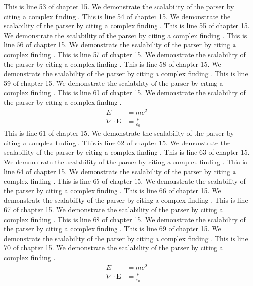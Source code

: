 This is line 53 of chapter 15. We demonstrate the scalability of the parser by citing a complex finding \cite{ref15_53}.
This is line 54 of chapter 15. We demonstrate the scalability of the parser by citing a complex finding \cite{ref15_54}.
This is line 55 of chapter 15. We demonstrate the scalability of the parser by citing a complex finding \cite{ref15_55}.
This is line 56 of chapter 15. We demonstrate the scalability of the parser by citing a complex finding \cite{ref15_56}.
This is line 57 of chapter 15. We demonstrate the scalability of the parser by citing a complex finding \cite{ref15_57}.
This is line 58 of chapter 15. We demonstrate the scalability of the parser by citing a complex finding \cite{ref15_58}.
This is line 59 of chapter 15. We demonstrate the scalability of the parser by citing a complex finding \cite{ref15_59}.
This is line 60 of chapter 15. We demonstrate the scalability of the parser by citing a complex finding \cite{ref15_60}.
\begin{align*}
  E &= mc^2 \\
  \nabla \cdot \mathbf{E} &= \frac{\rho}{\varepsilon_0}
\end{align*}
This is line 61 of chapter 15. We demonstrate the scalability of the parser by citing a complex finding \cite{ref15_61}.
This is line 62 of chapter 15. We demonstrate the scalability of the parser by citing a complex finding \cite{ref15_62}.
This is line 63 of chapter 15. We demonstrate the scalability of the parser by citing a complex finding \cite{ref15_63}.
This is line 64 of chapter 15. We demonstrate the scalability of the parser by citing a complex finding \cite{ref15_64}.
This is line 65 of chapter 15. We demonstrate the scalability of the parser by citing a complex finding \cite{ref15_65}.
This is line 66 of chapter 15. We demonstrate the scalability of the parser by citing a complex finding \cite{ref15_66}.
This is line 67 of chapter 15. We demonstrate the scalability of the parser by citing a complex finding \cite{ref15_67}.
This is line 68 of chapter 15. We demonstrate the scalability of the parser by citing a complex finding \cite{ref15_68}.
This is line 69 of chapter 15. We demonstrate the scalability of the parser by citing a complex finding \cite{ref15_69}.
This is line 70 of chapter 15. We demonstrate the scalability of the parser by citing a complex finding \cite{ref15_70}.
\begin{align*}
  E &= mc^2 \\
  \nabla \cdot \mathbf{E} &= \frac{\rho}{\varepsilon_0}
\end{align*}
